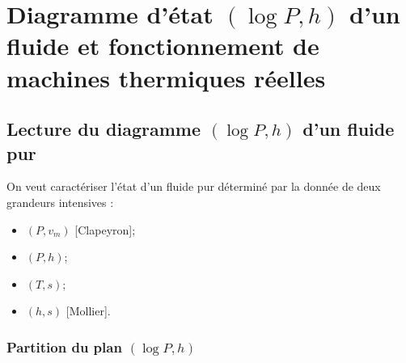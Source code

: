 \section[Diagramme d'état et machines réelles]{Diagramme d'état \texorpdfstring{$(\log P,h)$}{(log P,h)} d'un fluide et fonctionnement de machines thermiques réelles}

    \subsection{Lecture du diagramme \texorpdfstring{$(\log P,h)$}{(log P,h)} d'un fluide pur}

        On veut caractériser l'état d'un fluide pur déterminé par la donnée de deux grandeurs intensives :
        \begin{itemize}
            \item $(P,v_m)$ [Clapeyron];
            \item $(P,h)$;
            \item $(T,s)$;
            \item $(h,s)$ [Mollier].
        \end{itemize}

        \subsubsection{Partition du plan $(\log P,h)$}

